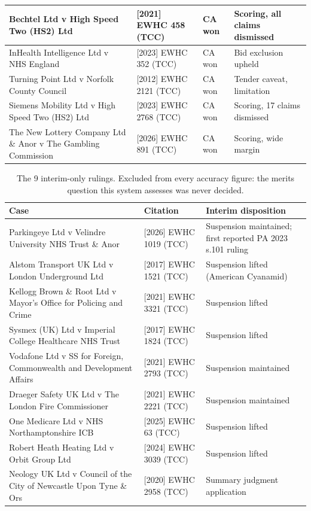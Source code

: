 \begin{table}[htbp]
\begin{tabular}{|p{5.3cm}|p{3.0cm}|p{1.3cm}|p{3.5cm}|}
\hline
Bechtel Ltd v High Speed Two (HS2) Ltd &
  [2021] EWHC 458 (TCC) & CA won & Scoring, all claims dismissed \\
\hline
InHealth Intelligence Ltd v NHS England &
  [2023] EWHC 352 (TCC) & CA won & Bid exclusion upheld \\
\hline
Turning Point Ltd v Norfolk County Council &
  [2012] EWHC 2121 (TCC) & CA won & Tender caveat, limitation \\
\hline
Siemens Mobility Ltd v High Speed Two (HS2) Ltd &
  [2023] EWHC 2768 (TCC) & CA won & Scoring, 17 claims dismissed \\
\hline
The New Lottery Company Ltd \& Anor v The Gambling Commission &
  [2026] EWHC 891 (TCC) & CA won & Scoring, wide margin \\
\hline
\end{tabular}
\end{table}

\begin{table}[htbp]
\centering
\scriptsize
\caption[Interim-only cases]{The 9 interim-only rulings. Excluded from every
accuracy figure: the merits question this system assesses was never decided.}
\label{tab:corpus-interim}
\begin{tabular}{|p{5.6cm}|p{3.0cm}|p{4.4cm}|}
\hline
\textbf{Case} & \textbf{Citation} & \textbf{Interim disposition} \\
\hline
Parkingeye Ltd v Velindre University NHS Trust \& Anor &
  [2026] EWHC 1019 (TCC) & Suspension maintained; first reported PA 2023 s.101 ruling \\
\hline
Alstom Transport UK Ltd v London Underground Ltd &
  [2017] EWHC 1521 (TCC) & Suspension lifted (American Cyanamid) \\
\hline
Kellogg Brown \& Root Ltd v Mayor's Office for Policing and Crime &
  [2021] EWHC 3321 (TCC) & Suspension lifted \\
\hline
Sysmex (UK) Ltd v Imperial College Healthcare NHS Trust &
  [2017] EWHC 1824 (TCC) & Suspension lifted \\
\hline
Vodafone Ltd v SS for Foreign, Commonwealth and Development Affairs &
  [2021] EWHC 2793 (TCC) & Suspension maintained \\
\hline
Draeger Safety UK Ltd v The London Fire Commissioner &
  [2021] EWHC 2221 (TCC) & Suspension maintained \\
\hline
One Medicare Ltd v NHS Northamptonshire ICB &
  [2025] EWHC 63 (TCC) & Suspension lifted \\
\hline
Robert Heath Heating Ltd v Orbit Group Ltd &
  [2024] EWHC 3039 (TCC) & Suspension lifted \\
\hline
Neology UK Ltd v Council of the City of Newcastle Upon Tyne \& Ors &
  [2020] EWHC 2958 (TCC) & Summary judgment application \\
\hline
\end{tabular}
\end{table}


